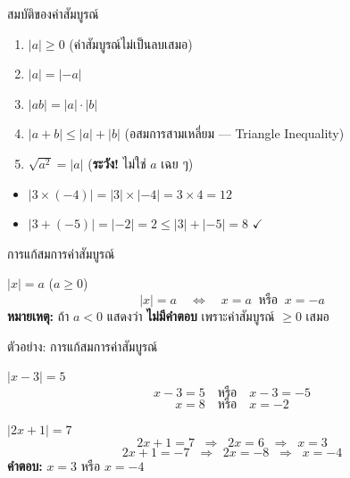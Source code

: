 \documentclass[11pt, aspectratio=169]{beamer}
\begin{document}
\begin{frame}{สมบัติของค่าสัมบูรณ์}
  \begin{explanation}
    \begin{enumerate}
      \item $|a| \geq 0$ \quad (ค่าสัมบูรณ์ไม่เป็นลบเสมอ)
      \item $|a| = |-a|$
      \item $|ab| = |a| \cdot |b|$
      \item $|a + b| \leq |a| + |b|$ \quad (อสมการสามเหลี่ยม — Triangle Inequality)
      \item $\sqrt{a^2} = |a|$ \quad (\textbf{ระวัง!} ไม่ใช่ $a$ เฉย ๆ)
    \end{enumerate}
  \end{explanation}

  \begin{exambox}
    \begin{itemize}
      \item $|3 \times (-4)| = |3| \times |-4| = 3 \times 4 = 12$
      \item $|3 + (-5)| = |-2| = 2 \leq |3| + |-5| = 8$ \quad $\checkmark$
    \end{itemize}
  \end{exambox}
\end{frame}

\begin{frame}{การแก้สมการค่าสัมบูรณ์}
  \begin{explanation}
    $|x| = a$ ($a \geq 0$)
    \[
      |x| = a \quad \iff \quad x = a \;\; \text{หรือ} \;\; x = -a
    \]
    \textbf{หมายเหตุ:} ถ้า $a < 0$ แสดงว่า \textbf{ไม่มีคำตอบ} เพราะค่าสัมบูรณ์ $\geq 0$ เสมอ
  \end{explanation}
\end{frame}

\begin{frame}{ตัวอย่าง: การแก้สมการค่าสัมบูรณ์}
  \begin{exambox}[โจทย์ 1]
    $|x - 3| = 5$
    \[
      x - 3 = 5 \quad \text{หรือ} \quad x - 3 = -5
    \]
    \[
      x = 8 \quad \text{หรือ} \quad x = -2
    \]
  \end{exambox}

  \begin{exambox}[โจทย์ 2]
    $|2x + 1| = 7$
    \[
      2x + 1 = 7 \;\; \Rightarrow \;\; 2x = 6 \;\; \Rightarrow \;\; x = 3
    \]
    \[
      2x + 1 = -7 \;\; \Rightarrow \;\; 2x = -8 \;\; \Rightarrow \;\; x = -4
    \]
    \textbf{คำตอบ:} $x = 3$ หรือ $x = -4$
  \end{exambox}
\end{frame}
\end{document}
